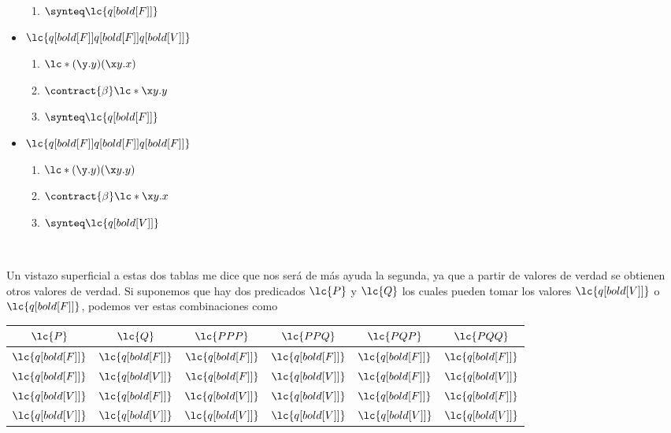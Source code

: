 \begin{itemize}
\begin{enumerate}
  \item \(\synteq \lc{q[bold[F]]}\)
  \end{enumerate}
\item \(\lc{q[bold[F]] q[bold[F]] q[bold[V]]}\)
  \begin{enumerate}
  \item \(\lc*{(\y.y)(\x y.x)}\)
  \item \(\contract{\beta} \lc*{\x y.y}\)
  \item \(\synteq \lc{q[bold[F]]}\)
  \end{enumerate}
\item \(\lc{q[bold[F]] q[bold[F]] q[bold[F]]}\)
  \begin{enumerate}
  \item \(\lc*{(\y.y)(\x y.y)}\)
  \item \(\contract{\beta} \lc*{\x y.x}\)
  \item \(\synteq \lc{q[bold[V]]}\)
  \end{enumerate}
\end{itemize} \

Un vistazo superficial a estas dos tablas me dice que nos será de más ayuda la segunda, ya que a partir de valores de verdad se obtienen otros valores de verdad. Si suponemos que hay dos predicados \(\lc{P}\) y \(\lc{Q}\) los cuales pueden tomar los valores \(\lc{q[bold[V]]}\) o \(\lc{q[bold[F]]}\), podemos ver estas combinaciones como \\

\begin{center}
 \begin{tabular}{|c|c|c|c|c|c|} 
 \hline
 \(\lc{P}\) & \(\lc{Q}\) & \(\lc{P P P}\) & \(\lc{P P Q}\) & \(\lc{P Q P}\) & \(\lc{P Q Q}\) \\ [0.5ex] 
 \hline\hline
 \(\lc{q[bold[F]]}\) & \(\lc{q[bold[F]]}\) & \(\lc{q[bold[F]]}\) & \(\lc{q[bold[F]]}\) & \(\lc{q[bold[F]]}\) & \(\lc{q[bold[F]]}\) \\ 
 \hline
 \(\lc{q[bold[F]]}\) & \(\lc{q[bold[V]]}\) & \(\lc{q[bold[F]]}\) & \(\lc{q[bold[V]]}\) & \(\lc{q[bold[F]]}\) & \(\lc{q[bold[V]]}\) \\
 \hline
 \(\lc{q[bold[V]]}\) & \(\lc{q[bold[F]]}\) & \(\lc{q[bold[V]]}\) & \(\lc{q[bold[V]]}\) & \(\lc{q[bold[F]]}\) & \(\lc{q[bold[F]]}\) \\
 \hline
 \(\lc{q[bold[V]]}\) & \(\lc{q[bold[V]]}\) & \(\lc{q[bold[V]]}\) & \(\lc{q[bold[V]]}\) & \(\lc{q[bold[V]]}\) & \(\lc{q[bold[V]]}\) \\ [1ex] 
 \hline
\end{tabular}
\end{center} \

